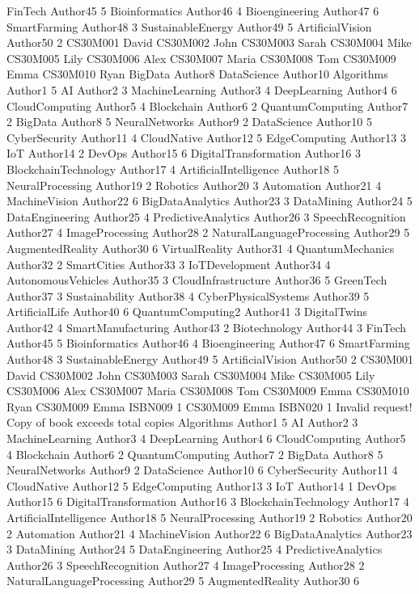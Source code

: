 FinTech Author45 5
Bioinformatics Author46 4
Bioengineering Author47 6
SmartFarming Author48 3
SustainableEnergy Author49 5
ArtificialVision Author50 2
CS30M001 David
CS30M002 John
CS30M003 Sarah
CS30M004 Mike
CS30M005 Lily
CS30M006 Alex
CS30M007 Maria
CS30M008 Tom
CS30M009 Emma
CS30M010 Ryan
BigData Author8
DataScience Author10
Algorithms Author1 5
AI Author2 3
MachineLearning Author3 4
DeepLearning Author4 6
CloudComputing Author5 4
Blockchain Author6 2
QuantumComputing Author7 2
BigData Author8 5
NeuralNetworks Author9 2
DataScience Author10 5
CyberSecurity Author11 4
CloudNative Author12 5
EdgeComputing Author13 3
IoT Author14 2
DevOps Author15 6
DigitalTransformation Author16 3
BlockchainTechnology Author17 4
ArtificialIntelligence Author18 5
NeuralProcessing Author19 2
Robotics Author20 3
Automation Author21 4
MachineVision Author22 6
BigDataAnalytics Author23 3
DataMining Author24 5
DataEngineering Author25 4
PredictiveAnalytics Author26 3
SpeechRecognition Author27 4
ImageProcessing Author28 2
NaturalLanguageProcessing Author29 5
AugmentedReality Author30 6
VirtualReality Author31 4
QuantumMechanics Author32 2
SmartCities Author33 3
IoTDevelopment Author34 4
AutonomousVehicles Author35 3
CloudInfrastructure Author36 5
GreenTech Author37 3
Sustainability Author38 4
CyberPhysicalSystems Author39 5
ArtificialLife Author40 6
QuantumComputing2 Author41 3
DigitalTwins Author42 4
SmartManufacturing Author43 2
Biotechnology Author44 3
FinTech Author45 5
Bioinformatics Author46 4
Bioengineering Author47 6
SmartFarming Author48 3
SustainableEnergy Author49 5
ArtificialVision Author50 2
CS30M001 David
CS30M002 John
CS30M003 Sarah
CS30M004 Mike
CS30M005 Lily
CS30M006 Alex
CS30M007 Maria
CS30M008 Tom
CS30M009 Emma
CS30M010 Ryan
CS30M009 Emma ISBN009 1
CS30M009 Emma ISBN020 1
Invalid request! Copy of book exceeds total copies
Algorithms Author1 5
AI Author2 3
MachineLearning Author3 4
DeepLearning Author4 6
CloudComputing Author5 4
Blockchain Author6 2
QuantumComputing Author7 2
BigData Author8 5
NeuralNetworks Author9 2
DataScience Author10 6
CyberSecurity Author11 4
CloudNative Author12 5
EdgeComputing Author13 3
IoT Author14 1
DevOps Author15 6
DigitalTransformation Author16 3
BlockchainTechnology Author17 4
ArtificialIntelligence Author18 5
NeuralProcessing Author19 2
Robotics Author20 2
Automation Author21 4
MachineVision Author22 6
BigDataAnalytics Author23 3
DataMining Author24 5
DataEngineering Author25 4
PredictiveAnalytics Author26 3
SpeechRecognition Author27 4
ImageProcessing Author28 2
NaturalLanguageProcessing Author29 5
AugmentedReality Author30 6
